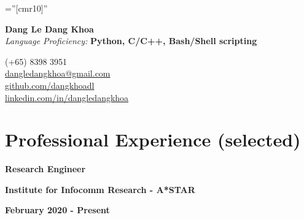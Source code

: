 \documentclass[10pt]{article}
\begin{document}
    \pagestyle{empty}       %
    \font\fb=''[cmr10]''    %

    \begin{multicols}{2}
        \begin{flushleft}
            \textbf{{\Huge Dang Le Dang Khoa }} \\
            \vspace{2mm}
            \emph{Language Proficiency:} \textbf{Python, C/C++, Bash/Shell scripting}
        \end{flushleft}

        \columnbreak

        \begin{flushright}
            \textsc (+65) 8398 3951 \\
            \href{mailto:dangledangkhoa@gmail.com}{dangledangkhoa@gmail.com} \\
            \href{https://github.com/dangkhoadl}{github.com/dangkhoadl} \\
            \href{https://sg.linkedin.com/in/dangledangkhoa}{linkedin.com/in/dangledangkhoa}
        \end{flushright}
    \end{multicols}


    \vspace{-5mm}
    \section{Professional Experience (selected)}

        \begin{multicols}{3}
            \begin{flushleft}
                \textbf{Research Engineer}
            \end{flushleft}

            \columnbreak

            \begin{center}
                \textbf{Institute for Infocomm Research - A*STAR}
            \end{center}

            \columnbreak

            \begin{flushright}
                \textbf{February 2020 - Present}
            \end{flushright}
        \end{multicols}
\end{document}
